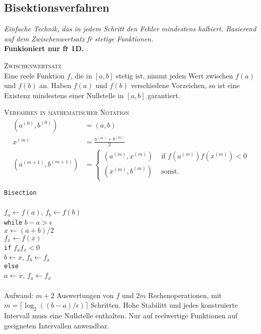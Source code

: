 \subsection{Bisektionsverfahren}
\emph{Einfache Technik, das in jedem Schritt den Fehler mindestens halbiert. Basierend auf dem Zwischenwertsatz f\u r stetige Funktionen.}\\
\textbf{Funkioniert nur f\u r 1D.}\vspace{0.2cm}

\textsc{Zwischenwertsatz}\\
Eine reele Funktion $f$, die in $[a,b]$ stetig ist, nimmt jeden Wert zwischen $f(a)$ und $f(b)$ an. Haben $f(a)$ und $f(b)$ verschiedene Vorzeichen, so ist eine Existenz mindestens einer Nullstelle in $[a,b]$ garantiert.\vspace{0.2cm}

\textsc{Verfahren in mathematischer Notation}\\
\begin{align*}
(a^{(0)}, b^{(0)}) &= (a,b)\\
x^{(m)} &= \frac{a^{(m)} + b^{(m)}}{2} \\
(a^{(m+1)}, b^{(m+1)}) &= \begin{cases}
(a^{(m)}, x^{(m)}) & \text{ if } f(a^{(m)})f(x^{(m)}) < 0 \\
(x^{(m)}, b^{(m)}) & \text{ sonst.}
\end{cases}
\end{align*}


\verb!Bisection!\\
{\addtolength{\leftskip}{0mm}
\hrulefill\\
$f_a \leftarrow f(a)$, $f_b \leftarrow f(b)$\\
\verb!while! $b-a>\epsilon$\\
\quad $x \leftarrow (a+b)/2$ \\
\quad $f_x \leftarrow f(x)$ \\
\quad \verb!if! $f_af_x < 0$ \\ 
\qquad $b \leftarrow x$, $f_b \leftarrow f_x$ \\
\quad \verb!else! \\
\qquad $a \leftarrow x$, $f_a \leftarrow f_x$ \\
\hrulefill\\
}
Aufwand: $m+2$ Auswertungen von $f$ und $2m$ Rechenoperationen, mit $m=\lceil \log_2((b-a)/\epsilon)\rceil$ Schritten. Hohe Stabilit\a t und jedes konstruierte Intervall muss eine Nullstelle enthalten. Nur auf reelwertige Funktionen auf geeigneten Intervallen anwendbar.

